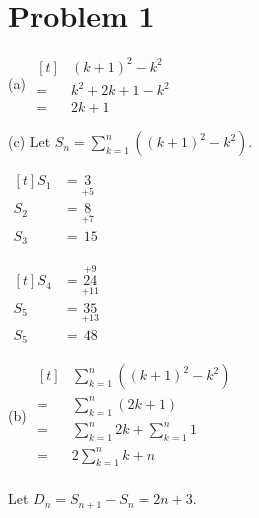 \documentclass{article}
\begin{document}
\section*{Problem 1}
\begin{itemize}
\begin{minipage}[t]{0.5\linewidth}
\item[(a)]
$\begin{aligned}[t]
	&(k+1)^2-k^2 \\
	=\,&k^2+2k+1-k^2 \\
	=\,&\boxed{2k+1}
\end{aligned}$

\item[(c)]
Let $\displaystyle{S_n=\sum_{k=1}^{n}\left((k+1)^2-k^2\right)}$.

\begin{minipage}[t]{0.2\linewidth}
$\begin{aligned}[t]
	S_1&=\underset{+5}{3} \\
	S_2&=\underset{+7}{8} \\
	S_3&=\,15
\end{aligned}$
\end{minipage}
\begin{minipage}[t]{0.2\linewidth}
$\begin{aligned}[t]
	S_4&=\underset{+11}{\overset{+9}{24}} \\
	S_5&=\underset{+13}{35} \\
	S_5&=\,48
\end{aligned}$
\end{minipage}
\end{minipage}
\begin{minipage}[t]{0.3\linewidth}
\item[(b)]
$\begin{aligned}[t]
	&\sum_{k=1}^{n}\left((k+1)^2-k^2\right) \\
	=\,&\sum_{k=1}^{n}(2k+1) \\
	=\,&\sum_{k=1}^{n}2k+\sum_{k=1}^{n}1 \\
	=\,&\boxed{2\sum_{k=1}^{n}k+n} \\
\end{aligned}$
\end{minipage}

Let $D_n=S_{n+1}-S_{n}=2n+3$.


\end{itemize}
\end{document}
